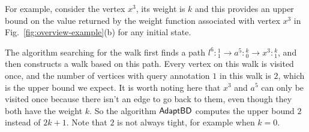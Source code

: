 For example, consider the vertex $x^{3}$, its weight is $k$ and this provides an upper bound on the value returned by the weight function  associated with vertex $x^{3}$ in Fig.~\ref{fig:overview-example}(b) for any initial state. 

The algorithm searching for the walk first finds a path $l^6:{}^1_1 \to a^5: {}^k_0 \to x^3: {}^k_1$, and then constructs a walk based on this path. Every vertex on this walk is visited once, and the number of vertices with query annotation $1$ in this walk is $2$, which is the upper bound we expect.
{It is worth noting here that $x^3$ and $a^5$ can only be visited once because there isn't an edge to go back to them, even though they both have the weight $k$}.  So the algorithm $\mathsf{AdaptBD}$ computes the upper bound $2$ instead of $2k+1$. Note that $2$ is not always tight, for example when $k = 0$.
